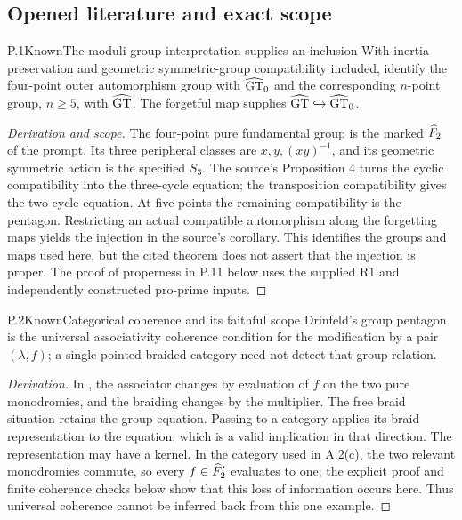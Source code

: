 \subsection{Opened literature and exact scope}


\begin{statement}{P.1}{Known}{The moduli-group interpretation supplies an inclusion}
With inertia preservation and geometric symmetric-group compatibility included,
\citet[Main Theorem and Corollary]{LitHarbaterSchneps2000} identify
the four-point outer automorphism group with $\widehat{\mathrm{GT}}_0$ and the corresponding
$n$-point group, $n\ge5$, with $\widehat{\mathrm{GT}}$. The forgetful map supplies
$\widehat{\mathrm{GT}}\hookrightarrow\widehat{\mathrm{GT}}_0$.
\end{statement}
\begin{proof}[Derivation and scope]
The four-point pure fundamental group is the marked $\widehat F_2$ of the prompt.
Its three peripheral classes are $x,y,(xy)^{-1}$, and its geometric
symmetric action is the specified $S_3$. The source's Proposition 4
turns the cyclic compatibility into the three-cycle equation; the
transposition compatibility gives the two-cycle equation. At five
points the remaining compatibility is the pentagon. Restricting an
actual compatible automorphism along the forgetting maps yields the
injection in the source's corollary. This identifies the groups and
maps used here, but the cited theorem does not assert that the injection
is proper. The proof of properness in P.11 below uses the supplied R1
and independently constructed pro-prime inputs.
\end{proof}

\begin{statement}{P.2}{Known}{Categorical coherence and its faithful scope}
Drinfeld's group pentagon is the universal associativity coherence
condition for the modification by a pair $(\lambda,f)$; a single
pointed braided category need not detect that group relation.
\end{statement}
\begin{proof}[Derivation]
In \citet[Section 4, equations (4.5), (4.10), (4.12), (4.13)]{LitDrinfeld1991},
the associator changes by evaluation of $f$ on the two pure monodromies,
and the braiding changes by the multiplier. The free braid situation
retains the group equation. Passing to a category applies its braid
representation to the equation, which is a valid implication in that
direction. The representation may have a kernel. In the category used
in A.2(c), the two relevant monodromies commute, so every $f\in\widehat F_2'$
evaluates to one; the explicit proof and finite coherence checks below
show that this loss of information occurs here. Thus universal
coherence cannot be inferred back from this one example.
\end{proof}


